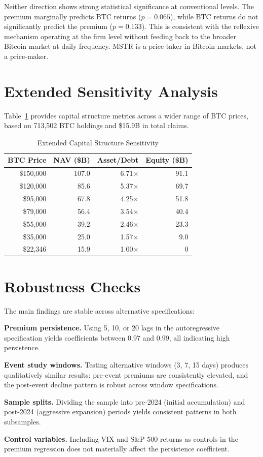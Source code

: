 Neither direction shows strong statistical significance at conventional levels. The premium marginally predicts BTC returns ($p = 0.065$), while BTC returns do not significantly predict the premium ($p = 0.133$). This is consistent with the reflexive mechanism operating at the firm level without feeding back to the broader Bitcoin market at daily frequency. MSTR is a price-taker in Bitcoin markets, not a price-maker.

\section{Extended Sensitivity Analysis}
\label{app:sensitivity}

Table~\ref{tab:sensitivity_detail} provides capital structure metrics across a wider range of BTC prices, based on 713,502 BTC holdings and \$15.9B in total claims.

\begin{table}[H]
\centering
\caption{Extended Capital Structure Sensitivity}
\label{tab:sensitivity_detail}
\begin{tabular}{@{}rrrr@{}}
\toprule
\textbf{BTC Price} & \textbf{NAV (\$B)} & \textbf{Asset/Debt} & \textbf{Equity (\$B)} \\
\midrule
\$150,000 & 107.0 & 6.71$\times$ & 91.1 \\
\$120,000 & 85.6 & 5.37$\times$ & 69.7 \\
\$95,000 & 67.8 & 4.25$\times$ & 51.8 \\
\$79,000 & 56.4 & 3.54$\times$ & 40.4 \\
\$55,000 & 39.2 & 2.46$\times$ & 23.3 \\
\$35,000 & 25.0 & 1.57$\times$ & 9.0 \\
\$22,346 & 15.9 & 1.00$\times$ & 0 \\
\bottomrule
\end{tabular}
\end{table}

\section{Robustness Checks}
\label{app:robustness}

The main findings are stable across alternative specifications:

\textbf{Premium persistence.} Using 5, 10, or 20 lags in the autoregressive specification yields coefficients between 0.97 and 0.99, all indicating high persistence.

\textbf{Event study windows.} Testing alternative windows (3, 7, 15 days) produces qualitatively similar results: pre-event premiums are consistently elevated, and the post-event decline pattern is robust across window specifications.

\textbf{Sample splits.} Dividing the sample into pre-2024 (initial accumulation) and post-2024 (aggressive expansion) periods yields consistent patterns in both subsamples.

\textbf{Control variables.} Including VIX and S\&P 500 returns as controls in the premium regression does not materially affect the persistence coefficient.

